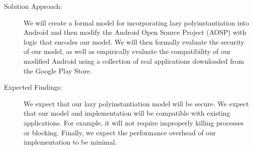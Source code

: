 \documentclass[10pt,pdftex]{article}
\begin{document}
\begin{description}
  \item[Solution Approach:]
    We will create a formal model for incorporating lazy polyinstantiation into Android and then modify the Android Open Source Project (AOSP) with logic that encodes our model.
    We will then formally evaluate the security of our model, as well as empirically evaluate the compatibility of our modified Android using a collection of real applications downloaded from the Google Play Store.

  \item[Expected Findings:]
    We expect that our lazy polyinstantiation model will be secure.
    We expect that our model and implementation will be compatible with existing applications.
    For example, it will not require improperly killing processes or blocking.
    Finally, we expect the performance overhead of our implementation to be minimal.

\end{description}
\end{document}
